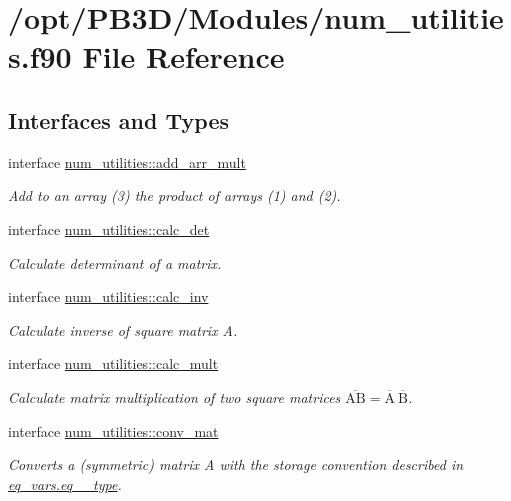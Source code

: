 \hypertarget{num__utilities_8f90}{}\section{/opt/\+P\+B3\+D/\+Modules/num\+\_\+utilities.f90 File Reference}
\label{num__utilities_8f90}
\subsection*{Interfaces and Types}
\begin{DoxyCompactItemize}
\item 
interface \hyperlink{interfacenum__utilities_1_1add__arr__mult}{num\+\_\+utilities\+::add\+\_\+arr\+\_\+mult}
\begin{DoxyCompactList}\small\item\em Add to an array (3) the product of arrays (1) and (2). \end{DoxyCompactList}\item 
interface \hyperlink{interfacenum__utilities_1_1calc__det}{num\+\_\+utilities\+::calc\+\_\+det}
\begin{DoxyCompactList}\small\item\em Calculate determinant of a matrix. \end{DoxyCompactList}\item 
interface \hyperlink{interfacenum__utilities_1_1calc__inv}{num\+\_\+utilities\+::calc\+\_\+inv}
\begin{DoxyCompactList}\small\item\em Calculate inverse of square matrix {\ttfamily A}. \end{DoxyCompactList}\item 
interface \hyperlink{interfacenum__utilities_1_1calc__mult}{num\+\_\+utilities\+::calc\+\_\+mult}
\begin{DoxyCompactList}\small\item\em Calculate matrix multiplication of two square matrices $\overline{\text{AB}} = \overline{\text{A}} \ \overline{\text{B}}$. \end{DoxyCompactList}\item 
interface \hyperlink{interfacenum__utilities_1_1conv__mat}{num\+\_\+utilities\+::conv\+\_\+mat}
\begin{DoxyCompactList}\small\item\em Converts a (symmetric) matrix A with the storage convention described in \hyperlink{structeq__vars_1_1eq__2__type}{eq\+\_\+vars.\+eq\+\_\+\_\+type}. \end{DoxyCompactList}\item 

\end{DoxyCompactItemize}
